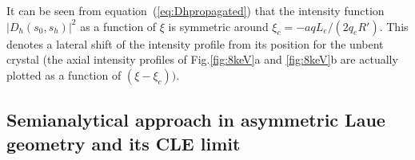 \documentclass[preprint]{iucr}              %
\newcommand{\todo}[1]{{\color{red}[TODO: "#1'']}}
\newcommand{\inred}[1]{{\color{red}#1}}
\begin{document}
\begin{figure}




\end{figure}

It can be seen from equation~(\ref{eq:Dhpropagated}) that the intensity function $|D_h(s_0,s_h)|^2$ as a function of $\xi$ is symmetric around $\xi_c=-a q L_e / (2 q_e R')$. This denotes a lateral shift of the intensity profile \inred{from its position for the unbent crystal} (the axial intensity profiles of Fig.\ref{fig:8keV}a and \ref{fig:8keV}b are actually \inred{plotted} as a function of $(\xi-\xi_c))$.

\subsection{Semianalytical approach in asymmetric Laue geometry \inred{and its CLE limit}}
\label{sec:LaueCompatibilityCLE}

\end{document}
